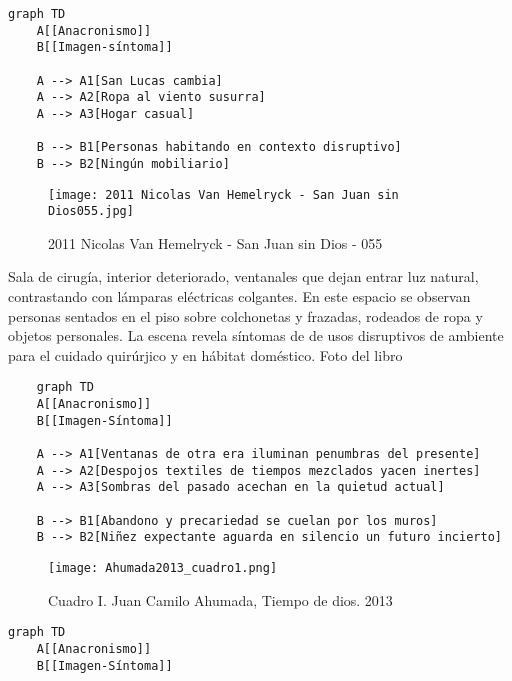{\small
\singlespacing \begin{verbatim}
graph TD
    A[[Anacronismo]]
    B[[Imagen-síntoma]]

    A --> A1[San Lucas cambia]
    A --> A2[Ropa al viento susurra]
    A --> A3[Hogar casual]

    B --> B1[Personas habitando en contexto disruptivo]
    B --> B2[Ningún mobiliario]
\end{verbatim}
\normalsize

\clearpage
\begin{figure}[h!]
    \centering
    \texttt{[image: 2011 Nicolas Van Hemelryck - San Juan sin Dios055.jpg]}
    \caption{2011 Nicolas Van Hemelryck - San Juan sin Dios - 055}
    \label{fig:2011NicolasVanHemelryckSanJuansinDios-055}
\end{figure}

Sala de cirugía, interior deteriorado, ventanales que dejan entrar luz natural, contrastando con lámparas eléctricas colgantes. En este espacio se observan personas sentados en el piso sobre colchonetas y frazadas, rodeados de ropa y objetos personales. La escena revela síntomas de de usos disruptivos de ambiente para el cuidado quirúrjico y en hábitat doméstico. Foto del libro \parencite{Hemelryck2011}

\small
\singlespacing \begin{verbatim}
    graph TD
    A[[Anacronismo]]
    B[[Imagen-Síntoma]]

    A --> A1[Ventanas de otra era iluminan penumbras del presente]
    A --> A2[Despojos textiles de tiempos mezclados yacen inertes]
    A --> A3[Sombras del pasado acechan en la quietud actual]

    B --> B1[Abandono y precariedad se cuelan por los muros]
    B --> B2[Niñez expectante aguarda en silencio un futuro incierto]

\end{verbatim}
\normalsize


\clearpage
\begin{figure}[h!]
    \centering
    \texttt{[image: Ahumada2013\_cuadro1.png]}
    \caption{Cuadro I. Juan Camilo Ahumada, Tiempo de dios. 2013}
    \label{fig:Ahumada2013_cuadro1}
\end{figure}

\parencite[p. 10]{Ahumada2013}

\small
\singlespacing \begin{verbatim}
graph TD
    A[[Anacronismo]]
    B[[Imagen-Síntoma]]
    

\end{verbatim}}
